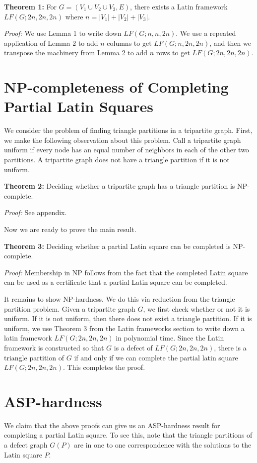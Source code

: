 \documentclass[11pt]{article}
\begin{document}
\textbf{Theorem 1:} For $G = (V_1 \cup V_2 \cup V_3,E)$, there exists a Latin framework $LF(G;2n,2n,2n)$ where $n = |V_1| + |V_2| + |V_3|$.

\emph{Proof:} We use Lemma 1 to write down $LF(G;n,n,2n)$. We use a repeated application of Lemma 2 to add $n$ columns to get $LF(G;n,2n,2n)$, and then we transpose the machinery from Lemma 2 to add $n$ rows to get $LF(G;2n,2n,2n)$.

\section{NP-completeness of Completing Partial Latin Squares}

We consider the problem of finding triangle partitions in a tripartite graph. First, we make the following observation about this problem. Call a tripartite graph uniform if every node has an equal number of neighbors in each of the other two partitions. A tripartite graph does not have a triangle partition if it is not uniform. 

\textbf{Theorem 2:} Deciding whether a tripartite graph has a triangle partition is NP-complete.

\emph{Proof:} See appendix.

Now we are ready to prove the main result.

\textbf{Theorem 3:} Deciding whether a partial Latin square can be completed is NP-complete.

\emph{Proof:} Membership in NP follows from the fact that the completed Latin square can be used as a certificate that a partial Latin square can be completed.

It remains to show NP-hardness. We do this via reduction from the triangle partition problem. Given a tripartite graph $G$, we first check whether or not it is uniform. If it is not uniform, then there does not exist a triangle partition. If it is uniform, we use Theorem 3 from the Latin frameworks section to write down a latin framework $LF(G;2n,2n,2n)$ in polynomial time. Since the Latin framework is constructed so that $G$ is a defect of $LF(G;2n,2n,2n)$, there is a triangle partition of $G$ if and only if we can complete the partial latin square $LF(G;2n,2n,2n)$. This completes the proof.

\section{ASP-hardness}

We claim that the above proofs can give us an ASP-hardness result for completing a partial Latin square. To see this, note that the triangle partitions of a defect graph $G(P)$ are in one to one correspondence with the solutions to the Latin square $P$.
\end{document}
